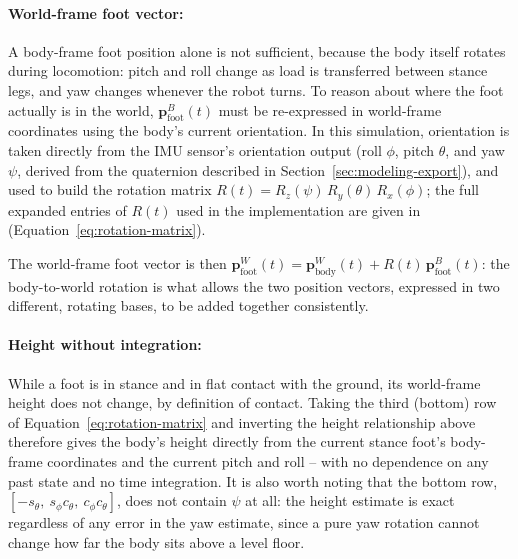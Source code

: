 \documentclass[12pt]{article}
\begin{document}
\paragraph{World-frame foot vector:} A body-frame foot position alone is not sufficient, because the body itself rotates during locomotion: pitch and roll change as load is transferred between stance legs, and yaw changes whenever the robot turns. To reason about where the foot actually is in the world, $\mathbf{p}^{B}_{\text{foot}}(t)$ must be re-expressed in world-frame coordinates using the body's current orientation. In this simulation, orientation is taken directly from the IMU sensor's orientation output (roll $\phi$, pitch $\theta$, and yaw $\psi$, derived from the quaternion described in Section~\ref{sec:modeling-export}), and used to build the rotation matrix $R(t) = R_z(\psi)\,R_y(\theta)\,R_x(\phi)$; the full expanded entries of $R(t)$ used in the implementation are given in  (Equation~\ref{eq:rotation-matrix}).

The world-frame foot vector is then $\mathbf{p}^{W}_{\text{foot}}(t) = \mathbf{p}^{W}_{\text{body}}(t) + R(t)\,\mathbf{p}^{B}_{\text{foot}}(t)$: the body-to-world rotation is what allows the two position vectors, expressed in two different, rotating bases, to be added together consistently.

\paragraph{Height without integration:} While a foot is in stance and in flat contact with the ground, its world-frame height does not change, by definition of contact. Taking the third (bottom) row of Equation~\eqref{eq:rotation-matrix} and inverting the height relationship above therefore gives the body's height directly from the current stance foot's body-frame coordinates and the current pitch and roll -- with no dependence on any past state and no time integration. It is also worth noting that the bottom row, $[-s_\theta,\ s_\phi c_\theta,\ c_\phi c_\theta]$, does not contain $\psi$ at all: the height estimate is exact regardless of any error in the yaw estimate, since a pure yaw rotation cannot change how far the body sits above a level floor.
\end{document}
